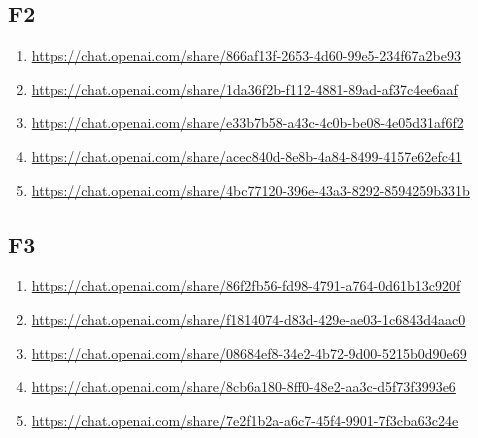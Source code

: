 \subsection{F2\label{F2-1}}

\begin{enumerate}
    \item \href{https://chat.openai.com/share/866af13f-2653-4d60-99e5-234f67a2be93}{https://chat.openai.com/share/866af13f-2653-4d60-99e5-234f67a2be93}
    \item \href{https://chat.openai.com/share/1da36f2b-f112-4881-89ad-af37c4ee6aaf}{https://chat.openai.com/share/1da36f2b-f112-4881-89ad-af37c4ee6aaf}
    \item \href{https://chat.openai.com/share/e33b7b58-a43c-4c0b-be08-4e05d31af6f2}{https://chat.openai.com/share/e33b7b58-a43c-4c0b-be08-4e05d31af6f2}
    \item \href{https://chat.openai.com/share/acec840d-8e8b-4a84-8499-4157e62efc41}{https://chat.openai.com/share/acec840d-8e8b-4a84-8499-4157e62efc41}
    \item \href{https://chat.openai.com/share/4bc77120-396e-43a3-8292-8594259b331b}{https://chat.openai.com/share/4bc77120-396e-43a3-8292-8594259b331b}
\end{enumerate}

\subsection{F3\label{F3-1}}

\begin{enumerate}
    \item \href{https://chat.openai.com/share/86f2fb56-fd98-4791-a764-0d61b13c920f}{https://chat.openai.com/share/86f2fb56-fd98-4791-a764-0d61b13c920f}
    \item \href{https://chat.openai.com/share/f1814074-d83d-429e-ae03-1c6843d4aac0}{https://chat.openai.com/share/f1814074-d83d-429e-ae03-1c6843d4aac0}
    \item \href{https://chat.openai.com/share/08684ef8-34e2-4b72-9d00-5215b0d90e69}{https://chat.openai.com/share/08684ef8-34e2-4b72-9d00-5215b0d90e69}
    \item \href{https://chat.openai.com/share/8cb6a180-8ff0-48e2-aa3c-d5f73f3993e6}{https://chat.openai.com/share/8cb6a180-8ff0-48e2-aa3c-d5f73f3993e6}
    \item \href{https://chat.openai.com/share/7e2f1b2a-a6c7-45f4-9901-7f3cba63c24e}{https://chat.openai.com/share/7e2f1b2a-a6c7-45f4-9901-7f3cba63c24e}
\end{enumerate}

